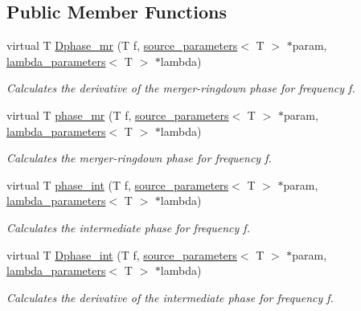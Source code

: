 \subsection*{Public Member Functions}
\begin{DoxyCompactItemize}
\item 
virtual T \hyperlink{classppE__IMRPhenomD__IMR_a3fa643eca535e7bef26f70bd5ed4cbde}{Dphase\+\_\+mr} (T f, \hyperlink{structsource__parameters}{source\+\_\+parameters}$<$ T $>$ $\ast$param, \hyperlink{structlambda__parameters}{lambda\+\_\+parameters}$<$ T $>$ $\ast$lambda)
\begin{DoxyCompactList}\small\item\em Calculates the derivative of the merger-\/ringdown phase for frequency f. \end{DoxyCompactList}\item 
virtual T \hyperlink{classppE__IMRPhenomD__IMR_a3b64e9bbf566450687bcfaa85c0e493f}{phase\+\_\+mr} (T f, \hyperlink{structsource__parameters}{source\+\_\+parameters}$<$ T $>$ $\ast$param, \hyperlink{structlambda__parameters}{lambda\+\_\+parameters}$<$ T $>$ $\ast$lambda)
\begin{DoxyCompactList}\small\item\em Calculates the merger-\/ringdown phase for frequency f. \end{DoxyCompactList}\item 
virtual T \hyperlink{classppE__IMRPhenomD__IMR_a04dc31c54da6e199db28197665b469a1}{phase\+\_\+int} (T f, \hyperlink{structsource__parameters}{source\+\_\+parameters}$<$ T $>$ $\ast$param, \hyperlink{structlambda__parameters}{lambda\+\_\+parameters}$<$ T $>$ $\ast$lambda)
\begin{DoxyCompactList}\small\item\em Calculates the intermediate phase for frequency f. \end{DoxyCompactList}\item 
virtual T \hyperlink{classppE__IMRPhenomD__IMR_a1625961885f0bf0723d1c12818cca287}{Dphase\+\_\+int} (T f, \hyperlink{structsource__parameters}{source\+\_\+parameters}$<$ T $>$ $\ast$param, \hyperlink{structlambda__parameters}{lambda\+\_\+parameters}$<$ T $>$ $\ast$lambda)
\begin{DoxyCompactList}\small\item\em Calculates the derivative of the intermediate phase for frequency f. \end{DoxyCompactList}\item 
\mbox{\label{classppE__IMRPhenomD__IMR_aa166b92183d7be3a1167d56b715049bb}} 

\end{DoxyCompactItemize}
